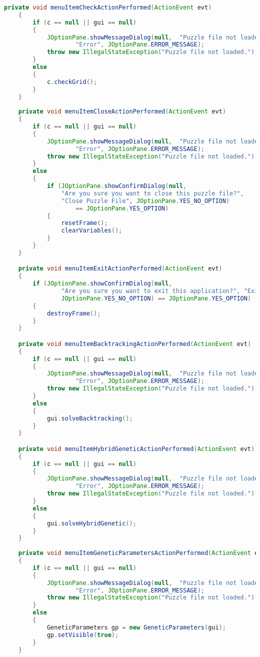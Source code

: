 \begin{lstlisting}[language=Java,basicstyle=\tiny,caption=Calcudoku.java]
    private void menuItemCheckActionPerformed(ActionEvent evt)
    {
        if (c == null || gui == null)
        {
            JOptionPane.showMessageDialog(null,  "Puzzle file not loaded.",
                    "Error", JOptionPane.ERROR_MESSAGE);
            throw new IllegalStateException("Puzzle file not loaded.");
        }
        else
        {
            c.checkGrid();
        }
    }
    
    private void menuItemCloseActionPerformed(ActionEvent evt)
    {
        if (c == null || gui == null)
        {
            JOptionPane.showMessageDialog(null,  "Puzzle file not loaded.",
                    "Error", JOptionPane.ERROR_MESSAGE);
            throw new IllegalStateException("Puzzle file not loaded.");
        }
        else
        {
            if (JOptionPane.showConfirmDialog(null,
                "Are you sure you want to close this puzzle file?", 
                "Close Puzzle File", JOptionPane.YES_NO_OPTION) 
                    == JOptionPane.YES_OPTION)
            {
                resetFrame();
                clearVariables();
            }
        }
    }

    private void menuItemExitActionPerformed(ActionEvent evt)
    {
        if (JOptionPane.showConfirmDialog(null,
                "Are you sure you want to exit this application?", "Exit",
                JOptionPane.YES_NO_OPTION) == JOptionPane.YES_OPTION)
        {
            destroyFrame();
        }
    }

    private void menuItemBacktrackingActionPerformed(ActionEvent evt)
    {
        if (c == null || gui == null)
        {
            JOptionPane.showMessageDialog(null,  "Puzzle file not loaded.",
                    "Error", JOptionPane.ERROR_MESSAGE);
            throw new IllegalStateException("Puzzle file not loaded.");
        }
        else
        {
            gui.solveBacktracking();
        }
    }

    private void menuItemHybridGeneticActionPerformed(ActionEvent evt)
    {
        if (c == null || gui == null)
        {
            JOptionPane.showMessageDialog(null,  "Puzzle file not loaded.",
                    "Error", JOptionPane.ERROR_MESSAGE);
            throw new IllegalStateException("Puzzle file not loaded.");
        }
        else
        {
            gui.solveHybridGenetic();
        }
    }
    
    private void menuItemGeneticParametersActionPerformed(ActionEvent evt)
    {
        if (c == null || gui == null)
        {
            JOptionPane.showMessageDialog(null,  "Puzzle file not loaded.",
                    "Error", JOptionPane.ERROR_MESSAGE);
            throw new IllegalStateException("Puzzle file not loaded.");
        }
        else
        {
            GeneticParameters gp = new GeneticParameters(gui);
            gp.setVisible(true);
        }
    }


\end{lstlisting}
